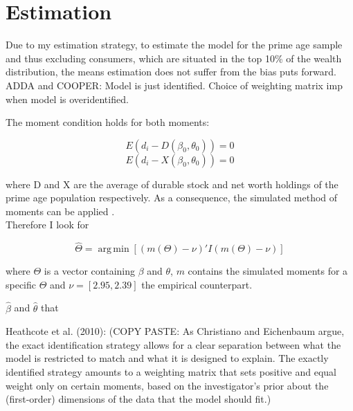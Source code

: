 \documentclass[a4paper,12pt]{article}
\begin{document}
\section{Estimation}
\label{estimation_procedure}

Due to my estimation strategy, to estimate the model for the prime age sample and thus excluding consumers, which are situated in the top 10\% of the wealth distribution, the means estimation does not suffer from the bias \cite{cagetti2003} puts forward. \\  

ADDA and COOPER: 
Model is just identified. Choice of weighting matrix imp when model is overidentified. 

The moment condition holds for both moments: 

\[ E(d_{i} -  D(\beta_{0},\theta_{0})) = 0 \]
\[ E(d_{i} -  X(\beta_{0},\theta_{0})) = 0 \]

where D and X are the average of durable stock and net worth holdings of the prime age population respectively. As a consequence, the simulated method of moments can be applied \citep{duffie1993}.\\

Therefore I look for 

\[ \widehat{\Theta} = \operatorname{arg\,min}[(m(\Theta )-\nu)'I(m(\Theta )-\nu)] \]

where $\Theta$ is a vector containing $\beta$ and $\theta$, $m$ contains the simulated moments for a specific $\Theta$ and $\nu = [2.95,2.39]$ the empirical counterpart. 

$\hat{\beta}$ and $\hat{\theta}$ that 




Heathcote et al. (2010): (COPY PASTE: As Christiano and Eichenbaum argue, the exact identification strategy allows for a clear separation between what the model is restricted to match and what it is designed to explain. The exactly identified strategy amounts to a weighting matrix that sets positive and equal weight only on certain moments, based on the investigator's prior about the (first-order) dimensions of the data that the model should fit.)
\end{document}
